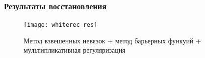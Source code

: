 \begin{frame}
\frametitle{Результаты восстановления}
\begin{figure}
\centering
\texttt{[image: whiterec\_res]}
\\
\caption{Метод взвешенных невязок + метод барьерных функуий + мультипликативная регуляризация}
\end{figure}
\end{frame}